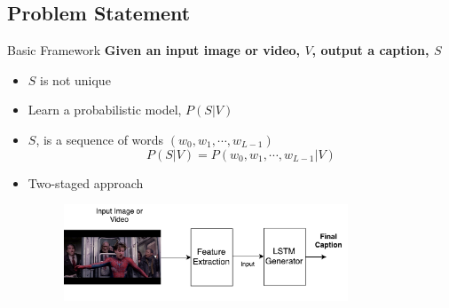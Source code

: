 \documentclass{beamer}
\begin{document}
\subsection{Problem Statement}
\begin{frame}{Basic Framework}
\textbf{Given an input image or video, $V$, output a caption, $S$}
\begin{itemize}
\item $S$ is not unique
\item Learn a probabilistic model, $P(S|V)$
\item $S$, is a sequence of words $(w_0, w_1,\cdots, w_{L-1})$
\begin{equation}
\label{eq:langB1} P(S|V) = P(w_0, w_1, \cdots, w_{L-1}|V)
\end{equation}
\item Two-staged approach
    {
        \begin{figure}[h]
            \centering
            \includegraphics[width=0.8\textwidth]{images/Thesis_generalBaseline.pdf}
        \end{figure}
     }
\end{itemize} 
\end{frame}
\end{document}
